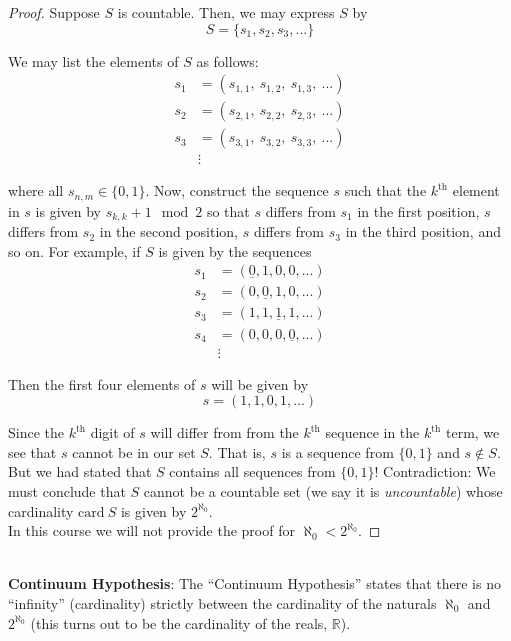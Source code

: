 \documentclass[12pt]{article}
\newlength\tindent
\renewcommand{\indent}{\hspace*{\tindent}}
\newcommand{\R}{\mathbb R}
\newcommand{\card}{\mathrm{card~}}
\begin{document}
\begin{proof} Suppose $S$ is countable. Then, we may express $S$ by
\begin{equation*}
	S = \{s_1, s_2, s_3, ...\}
\end{equation*}


We may list the elements of $S$ as follows:
\begin{align*}
	s_1 &= (s_{1,1},~ s_{1,2},~ s_{1,3},~ ...) \\
	s_2 &= (s_{2,1},~ s_{2,2},~ s_{2,3},~ ...) \\
	s_3 &= (s_{3,1},~ s_{3,2},~ s_{3,3},~ ...) \\
	&\vdots
\end{align*}

where all $s_{n,m} \in \{0, 1\}$. Now, construct the sequence $s$ such that the $k^\text{th}$ element in $s$ is given by $s_{k,k} + 1 \mod 2$ so that $s$ differs from $s_1$ in the first position, $s$ differs from $s_2$ in the second position, $s$ differs from $s_3$ in the third position, and so on. For example, if $S$ is given by the sequences
\begin{align*}
	s_1 &= (\underline{0}, 1, 0, 0, ...) \\
	s_2 &= (0, \underline{0}, 1, 0, ...) \\
	s_3 &= (1, 1, \underline{1}, 1, ...) \\
	s_4 &= (0, 0, 0, \underline{0}, ...) \\
	&\vdots
\end{align*}

Then the first four elements of $s$ will be given by
\begin{equation*}
	s = (1, 1, 0, 1, ...)
\end{equation*}

\indent Since the $k^\text{th}$ digit of $s$ will differ from from the $k^\text{th}$ sequence in the $k^\text{th}$ term, we see that $s$ cannot be in our set $S$. That is, $s$ is a sequence from $\{0, 1\}$ and $s \notin S$. But we had stated that $S$ contains all sequences from $\{0, 1\}$! Contradiction: We must conclude that $S$ cannot be a countable set (we say it is {\em uncountable}) whose cardinality $\card S$ is given by $2^{\aleph_0}$. \\

In this course we will not provide the proof for $\aleph_0 < 2^{\aleph_0}$.
\end{proof} \hfill\\

{\bf Continuum Hypothesis}: The ``Continuum Hypothesis'' states that there is no ``infinity'' (cardinality) strictly between the cardinality of the naturals $\aleph_0$ and $2^{\aleph_0}$ (this turns out to be the cardinality of the reals, $\R$). \\
\end{document}

